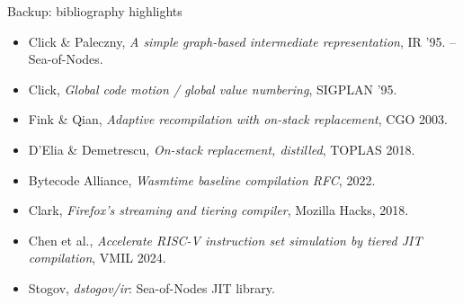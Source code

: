 \documentclass[aspectratio=169,11pt]{beamer}
\begin{document}
\begin{frame}{Backup: bibliography highlights}
  \footnotesize
  \begin{itemize}\setlength{\itemsep}{2pt}
    \item Click \& Paleczny, \emph{A simple graph-based intermediate representation}, IR '95. -- Sea-of-Nodes.
    \item Click, \emph{Global code motion / global value numbering}, SIGPLAN '95.
    \item Fink \& Qian, \emph{Adaptive recompilation with on-stack replacement}, CGO 2003.
    \item D'Elia \& Demetrescu, \emph{On-stack replacement, distilled}, TOPLAS 2018.
    \item Bytecode Alliance, \emph{Wasmtime baseline compilation RFC}, 2022.
    \item Clark, \emph{Firefox's streaming and tiering compiler}, Mozilla Hacks, 2018.
    \item Chen et al., \emph{Accelerate RISC-V instruction set simulation by tiered JIT compilation}, VMIL 2024.
    \item Stogov, \emph{dstogov/ir}: Sea-of-Nodes JIT library.
  \end{itemize}
\end{frame}
\end{document}
